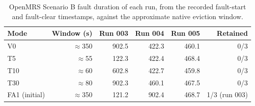 \documentclass[10pt]{article}
\begin{document}
\begin{table}[ht]
\centering
\caption{Scenario E outcomes under degraded control-plane networking.\label{tab:scenario-e-results}}
\end{table}

\begin{table}[ht]
\centering
\caption{OpenMRS Scenario B fault duration of each run, from the recorded fault-start and fault-clear timestamps, against the approximate native eviction window.\label{tab:openmrs-fault-window}}
\footnotesize
\setlength{\tabcolsep}{3pt}
\begin{tabular}{@{}lrrrrr@{}}
\toprule
Mode & Window (s) & Run 003 & Run 004 & Run 005 & Retained\\ \midrule
V0 & $\approx$350 & 902.5 & 422.3 & 460.1 & 0/3\\
T5 & $\approx$55 & 122.3 & 422.4 & 468.4 & 0/3\\
T10 & $\approx$60 & 602.8 & 422.7 & 459.8 & 0/3\\
T30 & $\approx$80 & 902.3 & 460.1 & 467.5 & 0/3\\
FA1 (initial) & $\approx$350 & 121.2 & 902.4 & 468.7 & 1/3 (run 003)\\ \bottomrule
\end{tabular}
\end{table}
\end{document}
